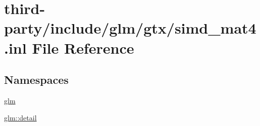\hypertarget{simd__mat4_8inl}{}\section{third-\/party/include/glm/gtx/simd\+\_\+mat4.inl File Reference}
\label{simd__mat4_8inl}
\subsection*{Namespaces}
\begin{DoxyCompactItemize}
\item 
 \hyperlink{namespaceglm}{glm}
\item 
 \hyperlink{namespaceglm_1_1detail}{glm\+::detail}
\end{DoxyCompactItemize}
